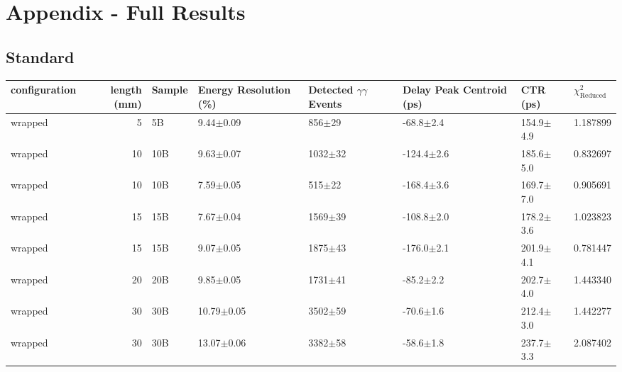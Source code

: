 \section*{Appendix - Full Results}
\subsection{Standard}

\begin{tabular}{lrlllll}
\hline
configuration &  length (mm) & Sample & Energy Resolution (\%) & Detected $\gamma\gamma$ Events & Delay Peak Centroid (ps) & CTR (ps) &  $\chi^2_\text{Reduced}$ \\
\hline
      wrapped &       5 &      5B &    9.44$\pm$0.09 &   856$\pm$29 &   -68.8$\pm$2.4 &  154.9$\pm$4.9 &    1.187899 \\
      wrapped &      10 &     10B &    9.63$\pm$0.07 &  1032$\pm$32 &  -124.4$\pm$2.6 &  185.6$\pm$5.0 &    0.832697 \\
      wrapped &      10 &     10B &    7.59$\pm$0.05 &   515$\pm$22 &  -168.4$\pm$3.6 &  169.7$\pm$7.0 &    0.905691 \\
      wrapped &      15 &     15B &    7.67$\pm$0.04 &  1569$\pm$39 &  -108.8$\pm$2.0 &  178.2$\pm$3.6 &    1.023823 \\
      wrapped &      15 &     15B &    9.07$\pm$0.05 &  1875$\pm$43 &  -176.0$\pm$2.1 &  201.9$\pm$4.1 &    0.781447 \\
      wrapped &      20 &     20B &    9.85$\pm$0.05 &  1731$\pm$41 &   -85.2$\pm$2.2 &  202.7$\pm$4.0 &    1.443340 \\
      wrapped &      30 &     30B &   10.79$\pm$0.05 &  3502$\pm$59 &   -70.6$\pm$1.6 &  212.4$\pm$3.0 &    1.442277 \\
      wrapped &      30 &     30B &   13.07$\pm$0.06 &  3382$\pm$58 &   -58.6$\pm$1.8 &  237.7$\pm$3.3 &    2.087402 \\
\hline
\end{tabular}

